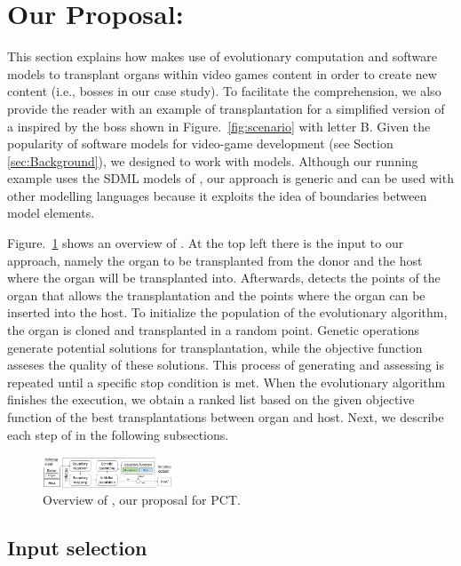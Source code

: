 \section{Our Proposal: \ApproachName{} } 
\label{sec:Approach}
This section explains  how \ApproachName{}  makes use of evolutionary computation and software models to transplant organs within video games content in order to create new content (i.e., \CaseStudy bosses in our case study). To facilitate the comprehension, we also provide the reader with an example of transplantation for a simplified version of a  \CaseStudy  {} inspired by the  boss shown in Figure.~\ref{fig:scenario} with letter B. Given the popularity of software models for video-game development (see Section \ref{sec:Background}),  we designed \ApproachName{}  to work with models. Although our running example uses the SDML models of \CaseStudy, our approach is generic and can be used with other modelling languages because it exploits the idea of boundaries between model elements.

Figure.~\ref{fig:approach} shows an overview of \ApproachName{}. At the top left there is the input to our approach, namely the organ to be transplanted from the donor and the host where the organ will be transplanted into. Afterwards, \ApproachName{} detects the points of the organ that allows the transplantation and the points where the organ can be inserted into the host. To initialize the population of the evolutionary algorithm, the organ is cloned and transplanted in a random point. Genetic operations generate potential solutions for transplantation, while the objective function asseses the quality of these solutions. This process of generating and assessing is repeated until a specific stop condition is met. When the evolutionary algorithm finishes the execution, we obtain a ranked list based on the given objective function of the best transplantations between organ and host. Next, we describe each step of \ApproachName{} in the following subsections.


\begin{figure}[tb]
    \centering
    \includegraphics[width=0.35\textwidth]{Figures/overview.png}
    \caption{Overview of  \ApproachName{}, our proposal for PCT.}
    \label{fig:approach}
\end{figure}


\subsection{Input selection}

